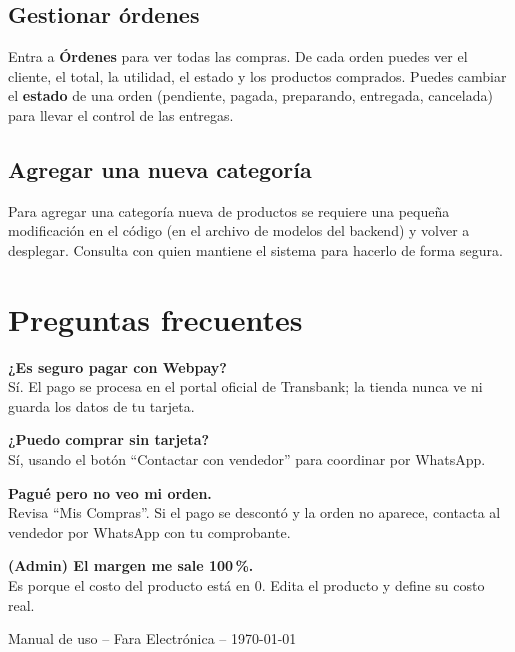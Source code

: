 \documentclass[11pt,a4paper]{article}
\begin{document}
\subsection{Gestionar órdenes}

Entra a \textbf{Órdenes} para ver todas las compras. De cada orden puedes ver el cliente,
el total, la utilidad, el estado y los productos comprados. Puedes cambiar el \textbf{estado}
de una orden (pendiente, pagada, preparando, entregada, cancelada) para llevar el control
de las entregas.

\subsection{Agregar una nueva categoría}

Para agregar una categoría nueva de productos se requiere una pequeña modificación en el
código (en el archivo de modelos del backend) y volver a desplegar. Consulta con quien
mantiene el sistema para hacerlo de forma segura.

\section{Preguntas frecuentes}

\textbf{¿Es seguro pagar con Webpay?}\\
Sí. El pago se procesa en el portal oficial de Transbank; la tienda nunca ve ni guarda
los datos de tu tarjeta.

\vspace{0.3cm}
\textbf{¿Puedo comprar sin tarjeta?}\\
Sí, usando el botón ``Contactar con vendedor'' para coordinar por WhatsApp.

\vspace{0.3cm}
\textbf{Pagué pero no veo mi orden.}\\
Revisa ``Mis Compras''. Si el pago se descontó y la orden no aparece, contacta al vendedor
por WhatsApp con tu comprobante.

\vspace{0.3cm}
\textbf{(Admin) El margen me sale 100\,\%.}\\
Es porque el costo del producto está en 0. Edita el producto y define su costo real.

\vspace{1cm}
\begin{center}
\textcolor{faragris}{\small Manual de uso -- Fara Electrónica -- \today}
\end{center}
\end{document}
